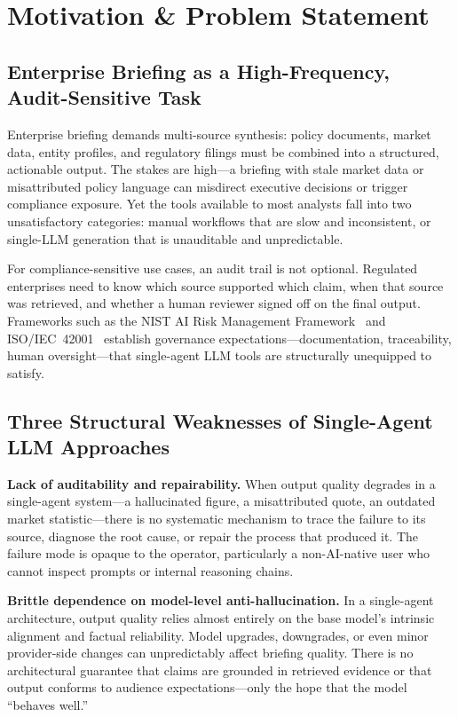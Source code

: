\documentclass[11pt,a4paper]{article}
\begin{document}
\section{Motivation \& Problem Statement}
\label{sec:motivation}

\subsection{Enterprise Briefing as a High-Frequency, Audit-Sensitive Task}

Enterprise briefing demands multi-source synthesis: policy documents, market data, entity profiles, and regulatory filings must be combined into a structured, actionable output. The stakes are high---a briefing with stale market data or misattributed policy language can misdirect executive decisions or trigger compliance exposure. Yet the tools available to most analysts fall into two unsatisfactory categories: manual workflows that are slow and inconsistent, or single-LLM generation that is unauditable and unpredictable.

For compliance-sensitive use cases, an audit trail is not optional. Regulated enterprises need to know which source supported which claim, when that source was retrieved, and whether a human reviewer signed off on the final output. Frameworks such as the NIST AI Risk Management Framework~\cite{nist_airmf} and ISO/IEC~42001~\cite{iso42001} establish governance expectations---documentation, traceability, human oversight---that single-agent LLM tools are structurally unequipped to satisfy.

\subsection{Three Structural Weaknesses of Single-Agent LLM Approaches}

\textbf{Lack of auditability and repairability.} When output quality degrades in a single-agent system---a hallucinated figure, a misattributed quote, an outdated market statistic---there is no systematic mechanism to trace the failure to its source, diagnose the root cause, or repair the process that produced it. The failure mode is opaque to the operator, particularly a non-AI-native user who cannot inspect prompts or internal reasoning chains.

\textbf{Brittle dependence on model-level anti-hallucination.} In a single-agent architecture, output quality relies almost entirely on the base model's intrinsic alignment and factual reliability. Model upgrades, downgrades, or even minor provider-side changes can unpredictably affect briefing quality. There is no architectural guarantee that claims are grounded in retrieved evidence or that output conforms to audience expectations---only the hope that the model ``behaves well.''
\end{document}
